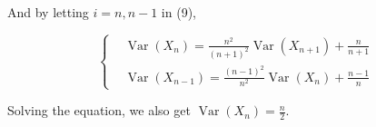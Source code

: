 \documentclass{article}
\begin{document}
And by letting $i=n,n-1$ in (9),

\begin{equation}
    \left\{\begin{aligned}
        & \operatorname{Var}(X_n) = \frac{n^2}{(n+1)^2}  \operatorname{Var}(X_{n+1}) + \frac{n}{n+1} \\
        & \operatorname{Var}(X_{n-1}) = \frac{(n-1)^2}{n^2}  \operatorname{Var}(X_{n}) + \frac{n-1}{n}
    \end{aligned}
        \right.
\end{equation}

Solving the equation, we also get $\operatorname{Var}(X_{n}) = \frac{n}{2}$.
\end{document}
